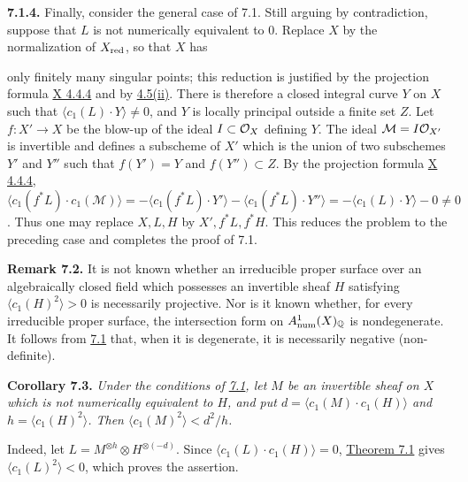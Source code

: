 \textbf{7.1.4.} Finally, consider the general case of 7.1. Still arguing by contradiction, suppose that $L$ is not numerically equivalent to $0$. Replace $X$ by the normalization of $X_{\mathrm{red}}$, so that $X$ has

only finitely many singular points; this reduction is justified by the projection formula \hyperlink{sga6.e10.eq.4-4-4}{X 4.4.4} and by \hyperlink{sga6.e13.prop.4-5}{4.5(ii)}. There is therefore a closed integral curve $Y$ on $X$ such that
$\langle c_1(L)\cdot Y\rangle\ne0$, and $Y$ is locally principal
outside a finite set $Z$. Let $f:X'\to X$ be the blow-up of the ideal
$I\subset\mathcal O_X$ defining $Y$. The ideal $\mathcal M=I\mathcal O_{X'}$ is
invertible and defines a subscheme of $X'$ which is the union of two
subschemes $Y'$ and $Y''$ such that $f(Y')=Y$ and $f(Y'')\subset Z$.
By the projection formula \hyperlink{sga6.e10.eq.4-4-4}{X 4.4.4},
$\langle c_1(f^*L)\cdot c_1(\mathcal M)\rangle
=-\langle c_1(f^*L)\cdot Y'\rangle
-\langle c_1(f^*L)\cdot Y''\rangle
=-\langle c_1(L)\cdot Y\rangle-0\ne0$. Thus one may replace $X,L,H$
by $X',f^*L,f^*H$. This reduces the problem to the preceding case and
completes the proof of 7.1.

\textbf{Remark 7.2.} It is not known whether an irreducible proper surface over an algebraically closed field which possesses an invertible sheaf $H$ satisfying $\langle c_1(H)^2\rangle>0$ is necessarily projective. Nor is it known whether, for every irreducible proper surface, the intersection form on $A^1_{\mathrm{num}}(X)_{\mathbb Q}$ is nondegenerate. It follows from \hyperlink{sga6.e13.thm.7-1}{7.1} that, when it is degenerate, it is necessarily negative (non-definite).

\textbf{Corollary 7.3.} \emph{Under the conditions of \hyperlink{sga6.e13.thm.7-1}{7.1}, let $M$ be
an invertible sheaf on $X$ which is not numerically equivalent to $H$,
and put $d=\langle c_1(M)\cdot c_1(H)\rangle$ and
$h=\langle c_1(H)^2\rangle$. Then
$\langle c_1(M)^2\rangle<d^2/h$.}

Indeed, let $L=M^{\otimes h}\otimes H^{\otimes(-d)}$. Since
$\langle c_1(L)\cdot c_1(H)\rangle=0$, \hyperlink{sga6.e13.thm.7-1}{Theorem 7.1} gives
$\langle c_1(L)^2\rangle<0$, which proves the assertion.

